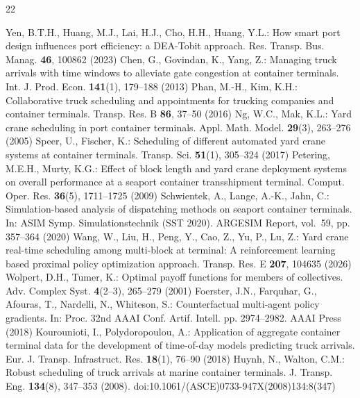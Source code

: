 \documentclass[a4paper]{llncs}
\begin{document}
\small
\begin{thebibliography}{22}
\raggedright
\setlength{\itemsep}{-1.6pt}
\setlength{\parsep}{0pt}
\setlength{\topsep}{2pt}
 Yen, B.T.H., Huang, M.J., Lai, H.J., Cho, H.H., Huang, Y.L.: How smart port design influences port efficiency: a DEA-Tobit approach. Res. Transp. Bus. Manag. \textbf{46}, 100862 (2023)
 Chen, G., Govindan, K., Yang, Z.: Managing truck arrivals with time windows to alleviate gate congestion at container terminals. Int. J. Prod. Econ. \textbf{141}(1), 179--188 (2013)
 Phan, M.-H., Kim, K.H.: Collaborative truck scheduling and appointments for trucking companies and container terminals. Transp. Res. B \textbf{86}, 37--50 (2016)
 Ng, W.C., Mak, K.L.: Yard crane scheduling in port container terminals. Appl. Math. Model. \textbf{29}(3), 263--276 (2005)
 Speer, U., Fischer, K.: Scheduling of different automated yard crane systems at container terminals. Transp. Sci. \textbf{51}(1), 305--324 (2017)
 Petering, M.E.H., Murty, K.G.: Effect of block length and yard crane deployment systems on overall performance at a seaport container transshipment terminal. Comput. Oper. Res. \textbf{36}(5), 1711--1725 (2009)
 Schwientek, A., Lange, A.-K., Jahn, C.: Simulation-based analysis of dispatching methods on seaport container terminals. In: ASIM Symp. Simulationstechnik (SST 2020). ARGESIM Report, vol.~59, pp. 357--364 (2020)
 Wang, W., Liu, H., Peng, Y., Cao, Z., Yu, P., Lu, Z.: Yard crane real-time scheduling among multi-block at terminal: A reinforcement learning based proximal policy optimization approach. Transp. Res. E \textbf{207}, 104635 (2026)
 Wolpert, D.H., Tumer, K.: Optimal payoff functions for members of collectives. Adv. Complex Syst. \textbf{4}(2--3), 265--279 (2001)
 Foerster, J.N., Farquhar, G., Afouras, T., Nardelli, N., Whiteson, S.: Counterfactual multi-agent policy gradients. In: Proc. 32nd AAAI Conf. Artif. Intell. pp. 2974--2982. AAAI Press (2018)
 Kourounioti, I., Polydoropoulou, A.: Application of aggregate container terminal data for the development of time-of-day models predicting truck arrivals. Eur. J. Transp. Infrastruct. Res. \textbf{18}(1), 76--90 (2018)
 Huynh, N., Walton, C.M.: Robust scheduling of truck arrivals at marine container terminals. J. Transp. Eng. \textbf{134}(8), 347--353 (2008). doi:10.1061/(ASCE)0733-947X(2008)134:8(347)

\end{thebibliography}
\end{document}
